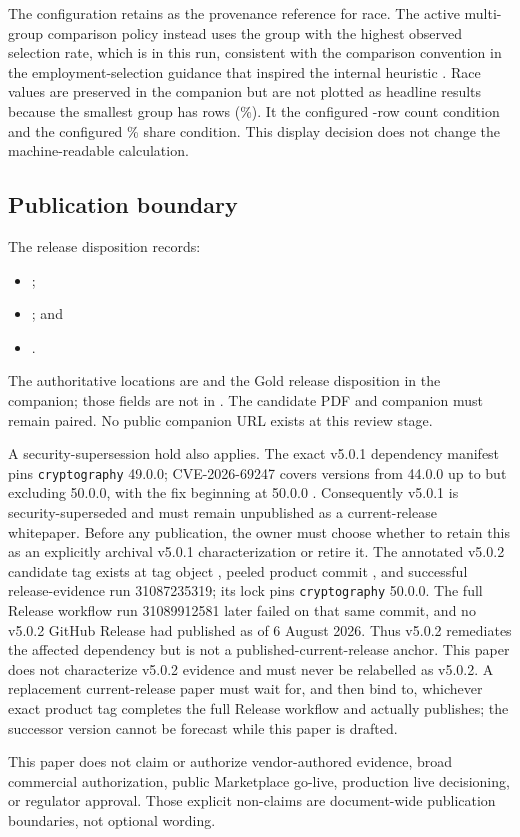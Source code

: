 The configuration retains \RaceConfiguredReference{} as the provenance reference for race. The
active multi-group comparison policy instead uses the group with the highest observed selection
rate, which is \RaceEffectiveReference{} in this run, consistent with the comparison convention in
the employment-selection guidance that inspired the internal heuristic \citep{eeoc_uniform_guidelines}.
Race values are preserved in the companion but are not plotted as headline results because the
smallest group has \RaceMinimumGroupN{} rows (\RaceMinimumGroupPct{}\%). It
\RaceCountFloorRelation{} the configured \RaceDisplayMinGroupN{}-row count condition and
\RaceShareFloorRelation{} the configured \RaceDisplayMinGroupPct{}\% share condition. This display
decision does not change the machine-readable calculation.

\subsection{Publication boundary}

The release disposition records:
\begin{itemize}
  \item {};
  \item {}; and
  \item {}.
\end{itemize}
The authoritative locations are
 and the Gold release disposition in the
companion; those fields are not in . The candidate PDF and companion
must remain paired. No public companion URL exists at this review stage.

A security-supersession hold also applies. The exact v5.0.1 dependency manifest pins
\texttt{cryptography} 49.0.0; CVE-2026-69247 covers versions from 44.0.0 up to but excluding
50.0.0, with the fix beginning at 50.0.0 \citep{github_cve_2026_69247}. Consequently v5.0.1 is
security-superseded and must remain unpublished as a current-release whitepaper. Before any
publication, the owner must choose whether to retain this as an explicitly archival v5.0.1
characterization or retire it. The annotated v5.0.2 candidate tag exists at tag object
, peeled product commit
, and successful release-evidence run
31087235319; its lock pins \texttt{cryptography} 50.0.0. The full Release workflow run 31089912581
later failed on that same commit, and no v5.0.2 GitHub Release had published as of 6 August 2026.
Thus v5.0.2 remediates the affected dependency but is not a published-current-release anchor. This
paper does not characterize v5.0.2 evidence and must never be relabelled as v5.0.2. A replacement
current-release paper must wait for, and then bind to, whichever exact product tag completes the
full Release workflow and actually publishes; the successor version cannot be forecast while this
paper is drafted.

This paper does not claim or authorize vendor-authored evidence, broad commercial authorization,
public Marketplace go-live, production live decisioning, or regulator approval. Those explicit
non-claims are document-wide publication boundaries, not optional wording.
